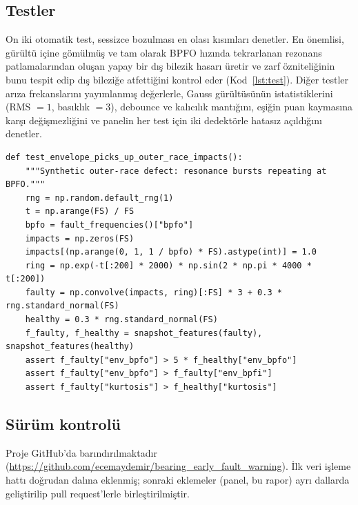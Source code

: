 \documentclass[11pt]{article}
\begin{document}
\subsection{Testler}
On iki otomatik test, sessizce bozulması en olası kısımları denetler. En önemlisi, gürültü içine
gömülmüş ve tam olarak BPFO hızında tekrarlanan rezonans patlamalarından oluşan yapay bir dış bilezik
hasarı üretir ve zarf özniteliğinin bunu tespit edip dış bileziğe atfettiğini kontrol eder
(Kod~\ref{lst:test}). Diğer testler arıza frekanslarını yayımlanmış değerlerle, Gauss gürültüsünün
istatistiklerini (RMS $=1$, basıklık $=3$), debounce ve kalıcılık mantığını, eşiğin puan kaymasına karşı
değişmezliğini ve panelin her test için iki dedektörle hatasız açıldığını denetler.

\begin{lstlisting}[caption={Yapay arıza testi (\code{tests/test\_core.py}'den alıntı).},label=lst:test]
def test_envelope_picks_up_outer_race_impacts():
    """Synthetic outer-race defect: resonance bursts repeating at BPFO."""
    rng = np.random.default_rng(1)
    t = np.arange(FS) / FS
    bpfo = fault_frequencies()["bpfo"]
    impacts = np.zeros(FS)
    impacts[(np.arange(0, 1, 1 / bpfo) * FS).astype(int)] = 1.0
    ring = np.exp(-t[:200] * 2000) * np.sin(2 * np.pi * 4000 * t[:200])
    faulty = np.convolve(impacts, ring)[:FS] * 3 + 0.3 * rng.standard_normal(FS)
    healthy = 0.3 * rng.standard_normal(FS)
    f_faulty, f_healthy = snapshot_features(faulty), snapshot_features(healthy)
    assert f_faulty["env_bpfo"] > 5 * f_healthy["env_bpfo"]
    assert f_faulty["env_bpfo"] > f_faulty["env_bpfi"]
    assert f_faulty["kurtosis"] > f_healthy["kurtosis"]
\end{lstlisting}

\subsection{Sürüm kontrolü}
Proje GitHub'da barındırılmaktadır
(\url{https://github.com/ecemaydemir/bearing_early_fault_warning}). İlk veri işleme hattı doğrudan
 dalına eklenmiş; sonraki eklemeler (panel, bu rapor) ayrı dallarda geliştirilip pull
request'lerle birleştirilmiştir.

\end{document}
